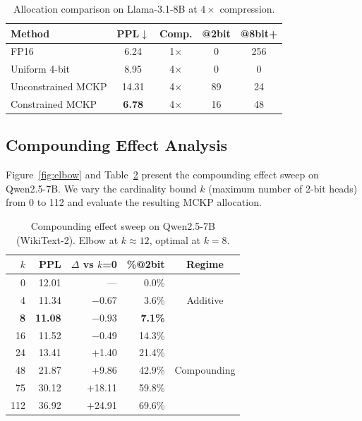 \documentclass[11pt,a4paper]{article}
\begin{document}
\begin{table}[t]
\centering
\small
\caption{Allocation comparison on Llama-3.1-8B at $4\times$ compression.}
\label{tab:llama_alloc}
\begin{tabular}{lcccc}
\toprule
\textbf{Method} & \textbf{PPL}$\downarrow$ & \textbf{Comp.} & \textbf{@2bit} & \textbf{@8bit+} \\
\midrule
FP16 & 6.24 & 1$\times$ & 0 & 256 \\
Uniform 4-bit & 8.95 & 4$\times$ & 0 & 0 \\
Unconstrained MCKP & 14.31 & 4$\times$ & 89 & 24 \\
Constrained MCKP & \textbf{6.78} & 4$\times$ & 16 & 48 \\
\bottomrule
\end{tabular}
\end{table}

\subsection{Compounding Effect Analysis}
\label{sec:compounding}

Figure~\ref{fig:elbow} and Table~\ref{tab:compounding} present the compounding effect sweep on Qwen2.5-7B.
We vary the cardinality bound $k$ (maximum number of 2-bit heads) from 0 to 112 and evaluate the resulting MCKP allocation.

\begin{table}[t]
\centering
\small
\caption{Compounding effect sweep on Qwen2.5-7B (WikiText-2). Elbow at $k \approx 12$, optimal at $k = 8$.}
\label{tab:compounding}
\begin{tabular}{rrrrc}
\toprule
$k$ & \textbf{PPL} & $\Delta$ \textbf{vs} $k$\textbf{=0} & \textbf{\%@2bit} & \textbf{Regime} \\
\midrule
0 & 12.01 & --- & 0.0\% & \multirow{3}{*}{Additive} \\
4 & 11.34 & $-$0.67 & 3.6\% & \\
\textbf{8} & \textbf{11.08} & $\mathbf{-0.93}$ & \textbf{7.1\%} & \\
\midrule
16 & 11.52 & $-$0.49 & 14.3\% & \multirow{5}{*}{Compounding} \\
24 & 13.41 & $+$1.40 & 21.4\% & \\
48 & 21.87 & $+$9.86 & 42.9\% & \\
75 & 30.12 & $+$18.11 & 59.8\% & \\
112 & 36.92 & $+$24.91 & 69.6\% & \\
\bottomrule
\end{tabular}
\end{table}
\end{document}
